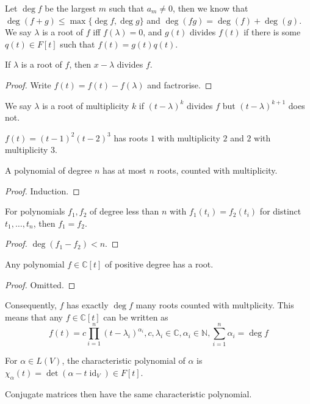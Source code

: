 Let $\deg f$ be the largest $m$ such that $a_m\neq 0$, then we know that $\deg(f+g)\le\max\{\deg f,\deg g\}$ and $\deg(fg)=\deg(f)+\deg(g)$.
We say $\lambda$ is a root of $f$ iff $f(\lambda)=0$, and $g(t)$ divides $f(t)$ if there is some $q(t)\in F[t]$ such that $f(t)=g(t)q(t)$.
\begin{lemma}
    If $\lambda$ is a root of $f$, then $x-\lambda$ divides $f$.
\end{lemma}
\begin{proof}
    Write $f(t)=f(t)-f(\lambda)$ and factrorise.
\end{proof}
\begin{remark}
    We say $\lambda$ is a root of multiplicity $k$ if $(t-\lambda)^k$ divides $f$ but $(t-\lambda)^{k+1}$ does not.
\end{remark}
\begin{example}
    $f(t)=(t-1)^2(t-2)^3$ has roots $1$ with multiplicity $2$ and $2$ with multiplicity $3$.
\end{example}
\begin{corollary}
    A polynomial of degree $n$ has at most $n$ roots, counted with multiplicity.
\end{corollary}
\begin{proof}
    Induction.
\end{proof}
\begin{corollary}
    For polynomials $f_1,f_2$ of degree less than $n$ with $f_1(t_i)=f_2(t_i)$ for distinct $t_1,\ldots,t_n$, then $f_1=f_2$.
\end{corollary}
\begin{proof}
    $\deg(f_1-f_2)<n$.
\end{proof}
\begin{theorem}
    Any polynomial $f\in \mathbb C[t]$ of positive degree has a root.
\end{theorem}
\begin{proof}
    Omitted.
\end{proof}
Consequently, $f$ has exactly $\deg f$ many roots counted with multplicity.
This means that any $f\in\mathbb C[t]$ can be written as
$$f(t)=c\prod_{i=1}^n(t-\lambda_i)^{\alpha_i},c,\lambda_i\in\mathbb C,\alpha_i\in\mathbb N, \sum_{i=1}^n\alpha_i=\deg f$$
\begin{definition}
    For $\alpha\in L(V)$, the characteristic polynomial of $\alpha$ is $\chi_\alpha(t)=\det(\alpha-t\operatorname{id}_V)\in F[t]$.
\end{definition}
\begin{remark}
    Conjugate matrices then have the same characteristic polynomial.
\end{remark}
